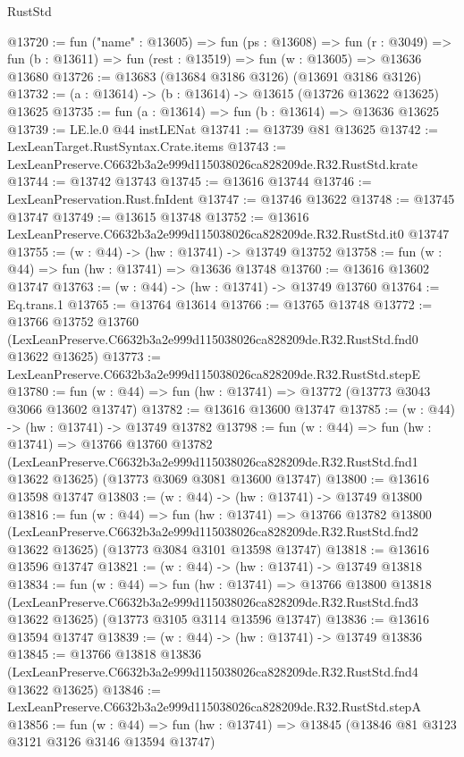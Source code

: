 \begin{lexlean}{RustStd}
\begin{coremodule}
@13720 := fun ("name" : @13605) =>
  fun (ps : @13608) =>
  fun (r : @3049) => fun (b : @13611) => fun (rest : @13519) => fun (w : @13605) => @13636 @13680
@13726 := @13683 (@13684 @3186 @3126) (@13691 @3186 @3126)
@13732 := (a : @13614) -> (b : @13614) -> @13615 (@13726 @13622 @13625) @13625
@13735 := fun (a : @13614) => fun (b : @13614) => @13636 @13625
@13739 := LE.le.{0} @44 instLENat
@13741 := @13739 @81 @13625
@13742 := LexLeanTarget.RustSyntax.Crate.items
@13743 := LexLeanPreserve.C6632b3a2e999d115038026ca828209de.R32.RustStd.krate
@13744 := @13742 @13743
@13745 := @13616 @13744
@13746 := LexLeanPreservation.Rust.fnIdent
@13747 := @13746 @13622
@13748 := @13745 @13747
@13749 := @13615 @13748
@13752 := @13616 LexLeanPreserve.C6632b3a2e999d115038026ca828209de.R32.RustStd.it0 @13747
@13755 := (w : @44) -> (hw : @13741) -> @13749 @13752
@13758 := fun (w : @44) => fun (hw : @13741) => @13636 @13748
@13760 := @13616 @13602 @13747
@13763 := (w : @44) -> (hw : @13741) -> @13749 @13760
@13764 := Eq.trans.{1}
@13765 := @13764 @13614
@13766 := @13765 @13748
@13772 := @13766
    @13752
    @13760
    (LexLeanPreserve.C6632b3a2e999d115038026ca828209de.R32.RustStd.fnd0 @13622 @13625)
@13773 := LexLeanPreserve.C6632b3a2e999d115038026ca828209de.R32.RustStd.stepE
@13780 := fun (w : @44) => fun (hw : @13741) => @13772 (@13773 @3043 @3066 @13602 @13747)
@13782 := @13616 @13600 @13747
@13785 := (w : @44) -> (hw : @13741) -> @13749 @13782
@13798 := fun (w : @44) =>
  fun (hw : @13741) =>
  @13766
    @13760
    @13782
    (LexLeanPreserve.C6632b3a2e999d115038026ca828209de.R32.RustStd.fnd1 @13622 @13625)
    (@13773 @3069 @3081 @13600 @13747)
@13800 := @13616 @13598 @13747
@13803 := (w : @44) -> (hw : @13741) -> @13749 @13800
@13816 := fun (w : @44) =>
  fun (hw : @13741) =>
  @13766
    @13782
    @13800
    (LexLeanPreserve.C6632b3a2e999d115038026ca828209de.R32.RustStd.fnd2 @13622 @13625)
    (@13773 @3084 @3101 @13598 @13747)
@13818 := @13616 @13596 @13747
@13821 := (w : @44) -> (hw : @13741) -> @13749 @13818
@13834 := fun (w : @44) =>
  fun (hw : @13741) =>
  @13766
    @13800
    @13818
    (LexLeanPreserve.C6632b3a2e999d115038026ca828209de.R32.RustStd.fnd3 @13622 @13625)
    (@13773 @3105 @3114 @13596 @13747)
@13836 := @13616 @13594 @13747
@13839 := (w : @44) -> (hw : @13741) -> @13749 @13836
@13845 := @13766
    @13818
    @13836
    (LexLeanPreserve.C6632b3a2e999d115038026ca828209de.R32.RustStd.fnd4 @13622 @13625)
@13846 := LexLeanPreserve.C6632b3a2e999d115038026ca828209de.R32.RustStd.stepA
@13856 := fun (w : @44) =>
  fun (hw : @13741) => @13845 (@13846 @81 @3123 @3121 @3126 @3146 @13594 @13747)

\end{coremodule}
\end{lexlean}
